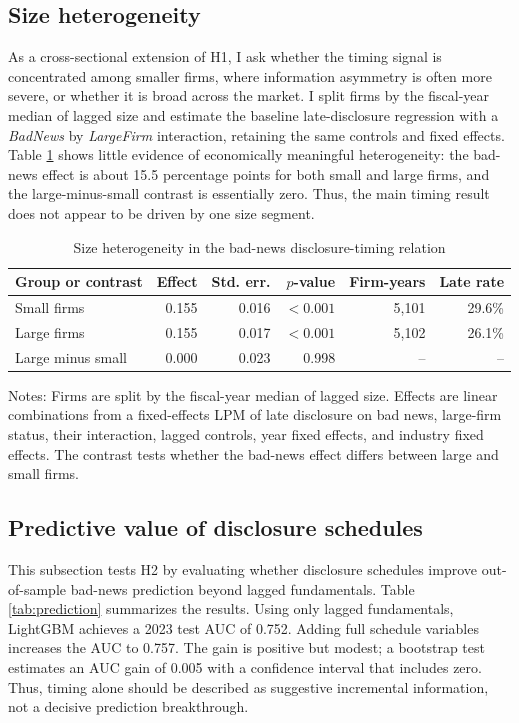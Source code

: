 \documentclass[10pt]{article}
\begin{document}
\subsection{Size heterogeneity}

As a cross-sectional extension of H1, I ask whether the timing signal is concentrated among smaller firms, where information asymmetry is often more severe, or whether it is broad across the market. I split firms by the fiscal-year median of lagged size and estimate the baseline late-disclosure regression with a \textit{BadNews} by \textit{LargeFirm} interaction, retaining the same controls and fixed effects. Table \ref{tab:sizehetero} shows little evidence of economically meaningful heterogeneity: the bad-news effect is about 15.5 percentage points for both small and large firms, and the large-minus-small contrast is essentially zero. Thus, the main timing result does not appear to be driven by one size segment.

\begin{table}[H]
\centering
\caption{Size heterogeneity in the bad-news disclosure-timing relation}
\label{tab:sizehetero}
\small
\begin{tabular}{lrrrrr}
\toprule
Group or contrast & Effect & Std. err. & $p$-value & Firm-years & Late rate \\
\midrule
Small firms & 0.155 & 0.016 & $<0.001$ & 5,101 & 29.6\% \\
Large firms & 0.155 & 0.017 & $<0.001$ & 5,102 & 26.1\% \\
Large minus small & 0.000 & 0.023 & 0.998 & -- & -- \\
\bottomrule
\end{tabular}
\begin{flushleft}
\footnotesize Notes: Firms are split by the fiscal-year median of lagged size. Effects are linear combinations from a fixed-effects LPM of late disclosure on bad news, large-firm status, their interaction, lagged controls, year fixed effects, and industry fixed effects. The contrast tests whether the bad-news effect differs between large and small firms.
\end{flushleft}
\end{table}

\subsection{Predictive value of disclosure schedules}

This subsection tests H2 by evaluating whether disclosure schedules improve out-of-sample bad-news prediction beyond lagged fundamentals. Table \ref{tab:prediction} summarizes the results. Using only lagged fundamentals, LightGBM achieves a 2023 test AUC of 0.752. Adding full schedule variables increases the AUC to 0.757. The gain is positive but modest; a bootstrap test estimates an AUC gain of 0.005 with a confidence interval that includes zero. Thus, timing alone should be described as suggestive incremental information, not a decisive prediction breakthrough.
\end{document}
